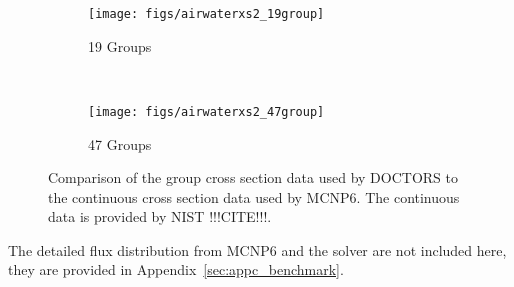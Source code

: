 \begin{figure}
    \centering
    \begin{subfigure}[b]{0.45\textwidth}
        \texttt{[image: figs/airwaterxs2\_19group]}
        \caption{19 Groups}
        \label{fig:airwaterxs19}
    \end{subfigure}
    ~
    \begin{subfigure}[b]{0.45\textwidth}
        \texttt{[image: figs/airwaterxs2\_47group]}
        \caption{47 Groups}
        \label{fig:airwaterxs47}
    \end{subfigure}
    \caption{Comparison of the group cross section data used by DOCTORS to the continuous cross section data used by MCNP6. The continuous data is provided by NIST !!!CITE!!!.}\label{fig:airwaterxs}
\end{figure}


The detailed flux distribution from MCNP6 and the solver are not included here, they are provided in Appendix~\ref{sec:appc_benchmark}.

